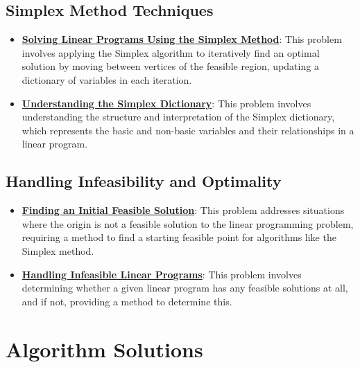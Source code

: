 \documentclass{article}%
\begin{document}
%
\subsection{Simplex Method Techniques}%
\label{subsec:SimplexMethodTechniques}%
\begin{itemize}[leftmargin=*]%
\item \href{https://www.math.purdue.edu/~yipn/421/2024-08-27-ExSimplex.pdf#page=6}{\textbf{Solving Linear Programs Using the Simplex Method}}: This problem involves applying the Simplex algorithm to iteratively find an optimal solution by moving between vertices of the feasible region, updating a dictionary of variables in each iteration.%
\item \href{https://www.math.purdue.edu/~yipn/421/2024-08-27-ExSimplex.pdf#page=26}{\textbf{Understanding the Simplex Dictionary}}: This problem involves understanding the structure and interpretation of the Simplex dictionary, which represents the basic and non-basic variables and their relationships in a linear program.%
\end{itemize}

%
\subsection{Handling Infeasibility and Optimality}%
\label{subsec:HandlingInfeasibilityandOptimality}%
\begin{itemize}[leftmargin=*]%
\item \href{https://www.math.purdue.edu/~yipn/421/2024-08-27-ExSimplex.pdf#page=30}{\textbf{Finding an Initial Feasible Solution}}: This problem addresses situations where the origin is not a feasible solution to the linear programming problem, requiring a method to find a starting feasible point for algorithms like the Simplex method.%
\item \href{https://www.math.purdue.edu/~yipn/421/2024-08-27-ExSimplex.pdf#page=30}{\textbf{Handling Infeasible Linear Programs}}: This problem involves determining whether a given linear program has any feasible solutions at all, and if not, providing a method to determine this.%
\end{itemize}

%
\section{Algorithm Solutions}%
\label{sec:AlgorithmSolutions}%
\end{document}
